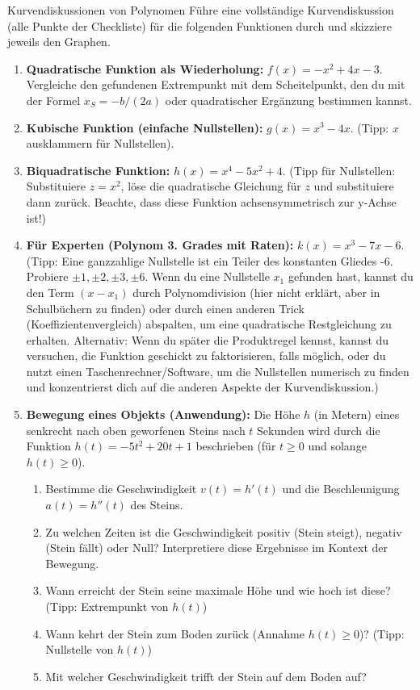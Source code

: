\begin{aufgabenumgebung}{Kurvendiskussionen von Polynomen}
Führe eine vollständige Kurvendiskussion (alle Punkte der Checkliste) für die folgenden Funktionen durch und skizziere jeweils den Graphen.
\begin{enumerate}
    \item \textbf{Quadratische Funktion als Wiederholung:} $f(x) = -x^2 + 4x - 3$. Vergleiche den gefundenen Extrempunkt mit dem Scheitelpunkt, den du mit der Formel $x_S = -b/(2a)$ oder quadratischer Ergänzung bestimmen kannst.
    \item \textbf{Kubische Funktion (einfache Nullstellen):} $g(x) = x^3 - 4x$. (Tipp: $x$ ausklammern für Nullstellen).
    \item \textbf{Biquadratische Funktion:} $h(x) = x^4 - 5x^2 + 4$. (Tipp für Nullstellen: Substituiere $z=x^2$, löse die quadratische Gleichung für $z$ und substituiere dann zurück. Beachte, dass diese Funktion achsensymmetrisch zur y-Achse ist!)
    \item \textbf{Für Experten (Polynom 3. Grades mit Raten):} $k(x) = x^3 - 7x - 6$. (Tipp: Eine ganzzahlige Nullstelle ist ein Teiler des konstanten Gliedes -6. Probiere $\pm 1, \pm 2, \pm 3, \pm 6$. Wenn du eine Nullstelle $x_1$ gefunden hast, kannst du den Term $(x-x_1)$ durch Polynomdivision (hier nicht erklärt, aber in Schulbüchern zu finden) oder durch einen anderen Trick (Koeffizientenvergleich) abspalten, um eine quadratische Restgleichung zu erhalten. Alternativ: Wenn du später die Produktregel kennst, kannst du versuchen, die Funktion geschickt zu faktorisieren, falls möglich, oder du nutzt einen Taschenrechner/Software, um die Nullstellen numerisch zu finden und konzentrierst dich auf die anderen Aspekte der Kurvendiskussion.)
        \item \textbf{Bewegung eines Objekts (Anwendung):}
        Die Höhe $h$ (in Metern) eines senkrecht nach oben geworfenen Steins nach $t$ Sekunden wird durch die Funktion $h(t) = -5t^2 + 20t + 1$ beschrieben (für $t \ge 0$ und solange $h(t) \ge 0$).
        \begin{enumerate}
            \item Bestimme die Geschwindigkeit $v(t) = h'(t)$ und die Beschleunigung $a(t) = h''(t)$ des Steins.
            \item Zu welchen Zeiten ist die Geschwindigkeit positiv (Stein steigt), negativ (Stein fällt) oder Null? Interpretiere diese Ergebnisse im Kontext der Bewegung.
            \item Wann erreicht der Stein seine maximale Höhe und wie hoch ist diese? (Tipp: Extrempunkt von $h(t)$)
            \item Wann kehrt der Stein zum Boden zurück (Annahme $h(t) \ge 0$)? (Tipp: Nullstelle von $h(t)$)
            \item Mit welcher Geschwindigkeit trifft der Stein auf dem Boden auf?
        \end{enumerate}
\end{enumerate}
\end{aufgabenumgebung}

